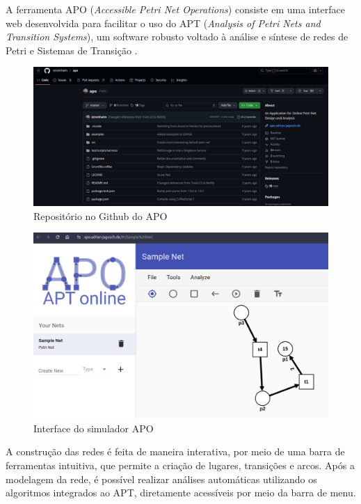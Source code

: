 \documentclass[
	12pt,				%
	openright,			%
	oneside,			%
	a4paper,			%
	english,			%
	brazil				%
	]{abntex2}
\begin{document}
A ferramenta APO (\textit{Accessible Petri Net Operations}) consiste em uma interface web desenvolvida para facilitar o uso do APT (\textit{Analysis of Petri Nets and Transition Systems}), um software robusto voltado à análise e síntese de redes de Petri e Sistemas de Transição \cite{apoGithub}. 

\begin{figure}[ht] 
	\centering
	\includegraphics[scale=0.30]{figuras/apoRepo.png}
	\caption[Repositório no Github do APO]{Repositório no Github do APO}
	\label{fig:pipeAPO}
\end{figure}
\FloatBarrier

\begin{figure}[ht] 
	\centering
	\includegraphics[scale=0.30]{figuras/apoInterface.png}
	\caption[Interface do simulador APO]{Interface do simulador APO}
	\label{fig:interfaceAPO}
\end{figure}
\FloatBarrier

A construção das redes é feita de maneira interativa, por meio de uma barra de ferramentas intuitiva, que permite a criação de lugares, transições e arcos. Após a modelagem da rede, é possível realizar análises automáticas utilizando os algoritmos integrados ao APT, diretamente acessíveis por meio da barra de menu. 
\end{document}
